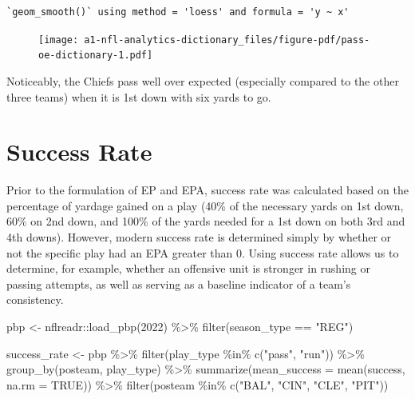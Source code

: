 \documentclass[
  letterpaper,
]{krantz}
\newenvironment{Shaded}{\begin{snugshade}}{\end{snugshade}}
\newcommand{\AttributeTok}[1]{\textcolor[rgb]{0.40,0.45,0.13}{#1}}
\newcommand{\ConstantTok}[1]{\textcolor[rgb]{0.56,0.35,0.01}{#1}}
\newcommand{\DecValTok}[1]{\textcolor[rgb]{0.68,0.00,0.00}{#1}}
\newcommand{\FunctionTok}[1]{\textcolor[rgb]{0.28,0.35,0.67}{#1}}
\newcommand{\NormalTok}[1]{\textcolor[rgb]{0.00,0.23,0.31}{#1}}
\newcommand{\OtherTok}[1]{\textcolor[rgb]{0.00,0.23,0.31}{#1}}
\newcommand{\SpecialCharTok}[1]{\textcolor[rgb]{0.37,0.37,0.37}{#1}}
\newcommand{\StringTok}[1]{\textcolor[rgb]{0.13,0.47,0.30}{#1}}
\begin{document}
\begin{verbatim}
`geom_smooth()` using method = 'loess' and formula = 'y ~ x'
\end{verbatim}

\begin{figure}[H]

{\centering \texttt{[image: a1-nfl-analytics-dictionary\_files/figure-pdf/pass-oe-dictionary-1.pdf]}

}

\end{figure}

Noticeably, the Chiefs pass well over expected (especially compared to
the other three teams) when it is 1st down with six yards to go.

\hypertarget{success-rate}{%
\section{Success Rate}\label{success-rate}}

Prior to the formulation of EP and EPA, success rate was calculated
based on the percentage of yardage gained on a play (40\% of the
necessary yards on 1st down, 60\% on 2nd down, and 100\% of the yards
needed for a 1st down on both 3rd and 4th downs). However, modern
success rate is determined simply by whether or not the specific play
had an EPA greater than 0. Using success rate allows us to determine,
for example, whether an offensive unit is stronger in rushing or passing
attempts, as well as serving as a baseline indicator of a team's
consistency.

\begin{Shaded}
\begin{Highlighting}[]
\NormalTok{pbp }\OtherTok{\textless{}{-}}\NormalTok{ nflreadr}\SpecialCharTok{::}\FunctionTok{load\_pbp}\NormalTok{(}\DecValTok{2022}\NormalTok{) }\SpecialCharTok{\%\textgreater{}\%}
  \FunctionTok{filter}\NormalTok{(season\_type }\SpecialCharTok{==} \StringTok{"REG"}\NormalTok{)}

\NormalTok{success\_rate }\OtherTok{\textless{}{-}}\NormalTok{ pbp }\SpecialCharTok{\%\textgreater{}\%}
  \FunctionTok{filter}\NormalTok{(play\_type }\SpecialCharTok{\%in\%} \FunctionTok{c}\NormalTok{(}\StringTok{"pass"}\NormalTok{, }\StringTok{"run"}\NormalTok{)) }\SpecialCharTok{\%\textgreater{}\%}
  \FunctionTok{group\_by}\NormalTok{(posteam, play\_type) }\SpecialCharTok{\%\textgreater{}\%}
  \FunctionTok{summarize}\NormalTok{(}\AttributeTok{mean\_success =} \FunctionTok{mean}\NormalTok{(success, }\AttributeTok{na.rm =} \ConstantTok{TRUE}\NormalTok{)) }\SpecialCharTok{\%\textgreater{}\%}
  \FunctionTok{filter}\NormalTok{(posteam }\SpecialCharTok{\%in\%} \FunctionTok{c}\NormalTok{(}\StringTok{"BAL"}\NormalTok{, }\StringTok{"CIN"}\NormalTok{, }\StringTok{"CLE"}\NormalTok{, }\StringTok{"PIT"}\NormalTok{))}
\end{Highlighting}
\end{Shaded}
\end{document}
